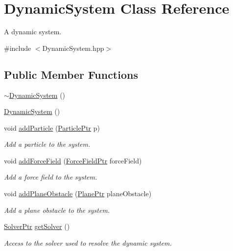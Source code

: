 \hypertarget{classDynamicSystem}{\section{Dynamic\+System Class Reference}
\label{classDynamicSystem}
}


A dynamic system.  




{\ttfamily \#include $<$Dynamic\+System.\+hpp$>$}

\subsection*{Public Member Functions}
\begin{DoxyCompactItemize}
\item 
\hyperlink{classDynamicSystem_ace85b160fa56e6f4fa62f6a02ccc9a4a}{$\sim$\+Dynamic\+System} ()
\item 
\hyperlink{classDynamicSystem_ac5828bf962f632ca9524d96c81c599bf}{Dynamic\+System} ()
\item 
void \hyperlink{classDynamicSystem_a115b000adc1b75600e5c64c147969cbc}{add\+Particle} (\hyperlink{Particle_8hpp_a9a7abc8635002993537b61ef2c857fdd}{Particle\+Ptr} p)
\begin{DoxyCompactList}\small\item\em Add a particle to the system. \end{DoxyCompactList}\item 
void \hyperlink{classDynamicSystem_a595af58167519d47bae1c6c323d79d87}{add\+Force\+Field} (\hyperlink{ForceField_8hpp_a42f2dc2cbbb9e0d734b92850c7b40d58}{Force\+Field\+Ptr} force\+Field)
\begin{DoxyCompactList}\small\item\em Add a force field to the system. \end{DoxyCompactList}\item 
void \hyperlink{classDynamicSystem_a98c771242b42c7864b2fad6a556efd59}{add\+Plane\+Obstacle} (\hyperlink{Plane_8hpp_a146e10989049e4a48eae6973c2f798f5}{Plane\+Ptr} plane\+Obstacle)
\begin{DoxyCompactList}\small\item\em Add a plane obstacle to the system. \end{DoxyCompactList}\item 
\hyperlink{Solver_8hpp_a0913049810bea42e7eeb97b03da7a93d}{Solver\+Ptr} \hyperlink{classDynamicSystem_a73a79c77859825060e2ec1e04d07659b}{get\+Solver} ()
\begin{DoxyCompactList}\small\item\em Access to the solver used to resolve the dynamic system. \end{DoxyCompactList}\item 

\end{DoxyCompactItemize}
